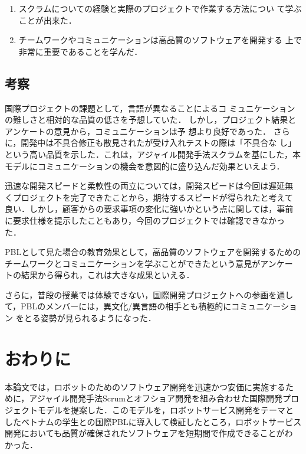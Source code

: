 \documentclass[a4j, 12Q, twocolumn, twoside]{jsarticle}
\begin{document}
\begin{enumerate}
 \item スクラムについての経験と実際のプロジェクトで作業する方法につい
       て学ぶことが出来た．
 \item チームワークやコミュニケーションは高品質のソフトウェアを開発する
       上で非常に重要であることを学んだ．
\end{enumerate}


\subsection{考察}

国際プロジェクトの課題として，言語が異なることによるコ
ミュニケーションの難しさと相対的な品質の低さを予想していた．
しかし，プロジェクト結果とアンケートの意見から，コミュニケーションは予
想より良好であった．
さらに，開発中は不具合修正も散見されたが受け入れテストの際は「不具合な
し」という高い品質を示した．これは，アジャイル開発手法スクラムを基にした，本
モデルにコミュニケーションの機会を意図的に盛り込んだ効果といえよう．


迅速な開発スピードと柔軟性の両立については，開発スピードは今回は遅延無
くプロジェクトを完了できたことから，期待するスピードが得られたと考えて
良い．しかし，顧客からの要求事項の変化に強いかという点に関しては，事前
に要求仕様を提示したこともあり，今回のプロジェクトでは確認できなかっ
た．

PBLとして見た場合の教育効果として，高品質のソフトウェアを開発するための
チームワークとコミュニケーションを学ぶことができたという意見がアンケー
トの結果から得られ，これは大きな成果といえる．

さらに，普段の授業では体験できない，国際開発プロジェクトへの参画を通し
て，PBLのメンバーには，異文化/異言語の相手とも積極的にコミュニケーション
をとる姿勢が見られるようになった．

\section{おわりに}\label{sec:concludion}
本論文では，ロボットのためのソフトウェア開発を迅速かつ安価に実施するた
めに，アジャイル開発手法Scrumとオフショア開発を組み合わせた国際開発プロ
ジェクトモデルを提案した．このモデルを，ロボットサービス開発をテーマと
したベトナムの学生との国際PBLに導入して検証したところ，ロボットサービス
開発においても品質が確保されたソフトウェアを短期間で作成できることがわ
かった．
\end{document}
